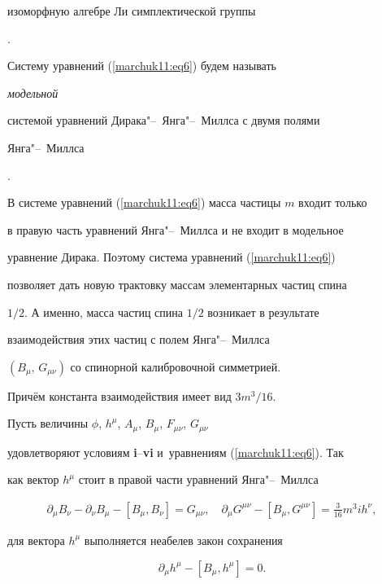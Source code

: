 изоморфную алгебре Ли симплектической группы

\cite{marchuk11:5}.



Систему уравнений (\ref{marchuk11:eq6}) будем называть {\em модельной

системой уравнений Дирака"--~Янга"--~Миллса с двумя полями

Янга"--~Миллса}.



В системе уравнений (\ref{marchuk11:eq6}) масса частицы $m$ входит только

в правую часть уравнений Янга"--~Миллса и не входит в модельное

уравнение Дирака. Поэтому система уравнений (\ref{marchuk11:eq6})

позволяет дать новую трактовку массам элементарных частиц спина

$1/2$. А именно,  масса частиц спина $1/2$ возникает в результате

взаимодействия этих частиц с полем Янга"--~Миллса

$(B_\mu, \,G_{\mu\nu})$ со спинорной калибровочной симметрией.

Причём  константа взаимодействия имеет вид ${3}m^3/{16}$.



Пусть величины $\phi$, $h^\mu$, $A_\mu$, $B_\mu$, $F_{\mu\nu}$, $G_{\mu\nu}$

удовлетворяют условиям {\bf i}--{\bf vi} и~уравнениям (\ref{marchuk11:eq6}). Так

как вектор $h^\mu$ стоит в правой части уравнений Янга"--~Миллса

\begin{gather*}

\partial_\mu B_\nu-\partial_\nu

B_\mu-[B_\mu, B_\nu]=G_{\mu\nu}, \quad 

\partial_\mu G^{\mu\nu}-[B_\mu, G^{\mu\nu}] =\frac{3}{16}m^3 i

h^\nu, 

\end{gather*}

для вектора $h^\mu$ выполняется неабелев закон сохранения

\begin{equation}

\partial_\mu h^\mu-[B_\mu, h^\mu]=0.

\label{marchuk11:eq7}

\end{equation}



